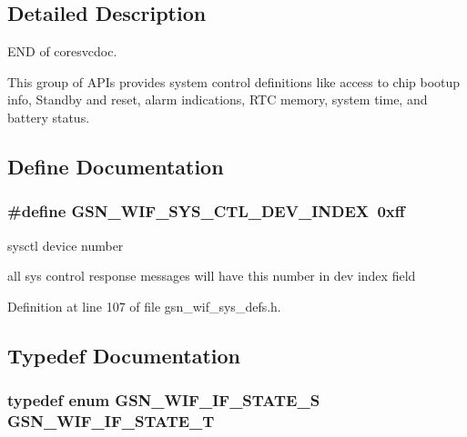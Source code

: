 \subsection{Detailed Description}
END of coresvcdoc.

This group of APIs provides system control definitions like access to chip bootup info, Standby and reset, alarm indications, RTC memory, system time, and battery status. 

\subsection{Define Documentation}
\hypertarget{a00639_ga89d2e01544259ce81d97d4161d5f3c51}{
\subsubsection[{GSN\_\-WIF\_\-SYS\_\-CTL\_\-DEV\_\-INDEX}]{\setlength{\rightskip}{0pt plus 5cm}\#define GSN\_\-WIF\_\-SYS\_\-CTL\_\-DEV\_\-INDEX~0xff}}
\label{a00639_ga89d2e01544259ce81d97d4161d5f3c51}


sysctl device number 

all sys control response messages will have this number in dev index field 

Definition at line 107 of file gsn\_\-wif\_\-sys\_\-defs.h.



\subsection{Typedef Documentation}
\hypertarget{a00639_ga7ff7134a0bdba9e91d4edf9cea797de7}{
\subsubsection[{GSN\_\-WIF\_\-IF\_\-STATE\_\-T}]{\setlength{\rightskip}{0pt plus 5cm}typedef enum {\bf GSN\_\-WIF\_\-IF\_\-STATE\_\-S}  {\bf GSN\_\-WIF\_\-IF\_\-STATE\_\-T}}}
\label{a00639_ga7ff7134a0bdba9e91d4edf9cea797de7}


